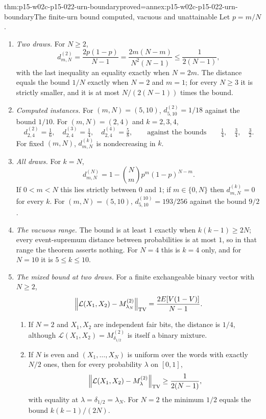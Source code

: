 \begin{hbtheorem}{thm:p15-w02c-p15-022-urn-boundary}{proved=annex:p15-w02c-p15-022-urn-boundary}{The finite-urn bound computed, vacuous and unattainable}
Let \(p=m/N\).
\begin{enumerate}
\item \emph{Two draws.} For \(N\geq2\),
      \[
       d_{m,N}^{(2)}=\frac{2p(1-p)}{N-1}=\frac{2m(N-m)}{N^2(N-1)}
       \leq\frac{1}{2(N-1)},
      \]
      with the last inequality an equality exactly when \(N=2m\). The
      distance equals the bound \(1/N\) exactly when \(N=2\) and
      \(m=1\); for every \(N\geq3\) it is strictly smaller, and it is at
      most \(N/(2(N-1))\) times the bound.
\item \emph{Computed instances.} For \((m,N)=(5,10)\),
      \(d_{5,10}^{(2)}=1/18\) against the bound \(1/10\). For
      \((m,N)=(2,4)\) and \(k=2,3,4\),
      \[
       d_{2,4}^{(2)}=\tfrac16,\quad
       d_{2,4}^{(3)}=\tfrac14,\quad
       d_{2,4}^{(4)}=\tfrac58,
       \qquad\text{against the bounds}\qquad
       \tfrac14,\quad\tfrac34,\quad\tfrac32 .
      \]
      For fixed \((m,N)\), \(d_{m,N}^{(k)}\) is nondecreasing in \(k\).
\item \emph{All draws.} For \(k=N\),
      \[
       d_{m,N}^{(N)}=1-\binom Nm p^m(1-p)^{N-m}.
      \]
      If \(0<m<N\) this lies strictly between \(0\) and \(1\); if
      \(m\in\{0,N\}\) then \(d_{m,N}^{(k)}=0\) for every \(k\). For
      \((m,N)=(5,10)\), \(d_{5,10}^{(10)}=193/256\) against the bound
      \(9/2\).
\item \emph{The vacuous range.} The bound is at least \(1\) exactly
      when \(k(k-1)\geq2N\); every event-supremum distance between
      probabilities is at most \(1\), so in that range the theorem
      asserts nothing. For \(N=4\) this is \(k=4\) only, and for
      \(N=10\) it is \(5\leq k\leq10\).
\item \emph{The mixed bound at two draws.} For a finite exchangeable
      binary vector with \(N\geq2\),
      \[
       \left\|\mathcal L(X_1,X_2)-M_{\lambda_N}^{(2)}\right\|_{\rm TV}
       =\frac{2E[V(1-V)]}{N-1}.
      \]
      \begin{enumerate}
      \item If \(N=2\) and \(X_1,X_2\) are independent fair bits, the
            distance is \(1/4\), although
            \(\mathcal L(X_1,X_2)=M_{\delta_{1/2}}^{(2)}\) is itself a
            binary mixture.
      \item If \(N\) is even and \((X_1,\ldots,X_N)\) is uniform over the
            words with exactly \(N/2\) ones, then for every probability
            \(\lambda\) on \([0,1]\),
            \[
             \left\|\mathcal L(X_1,X_2)-M_{\lambda}^{(2)}\right\|_{\rm TV}
             \geq\frac{1}{2(N-1)},
            \]
            with equality at \(\lambda=\delta_{1/2}=\lambda_N\). For
            \(N=2\) the minimum \(1/2\) equals the bound
            \(k(k-1)/(2N)\).
      \end{enumerate}
\end{enumerate}
\end{hbtheorem}

